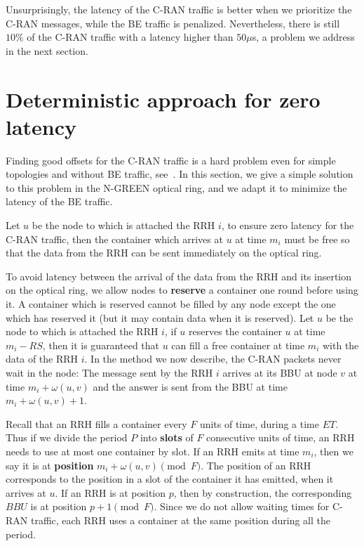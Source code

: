 \documentclass[]{llncs}
\begin{document}
Unsurprisingly, the latency of the C-RAN traffic is better when we prioritize the C-RAN messages, while the BE traffic is penalized. Nevertheless, there is still $10\%$ of the C-RAN traffic with a latency higher than $50 \mu$s, a problem we address in the next section.


\section{Deterministic approach for zero latency} \label{sec:deterministicalgorithms}

Finding good offsets for the C-RAN traffic is a hard problem even for simple topologies and without BE traffic, see~\cite{dominique2018deterministic}. In this section, we give a simple solution to this problem in the N-GREEN optical ring, and we adapt it to minimize the latency of the BE traffic.

Let $u$ be the node to which is attached the RRH $i$, to ensure zero latency for the C-RAN traffic, then the container which arrives at $u$ at time $m_i$ must be free so that the data from the RRH can be sent immediately on the optical ring. 

To avoid latency between the arrival of the data from the RRH and its insertion on the optical ring, 
we allow nodes to \textbf{reserve} a container one round before using it. A container which is reserved cannot be filled by any node except the one which has reserved it (but it may contain data when it is reserved). 
Let $u$ be the node to which is attached the RRH $i$, if $u$ reserves the container $u$ at time $m_i - RS$, then it is guaranteed that $u$ can fill a free container at time $m_i$ with the data of the RRH $i$.
In the method we now describe, the C-RAN packets never wait in the node: The message sent by the RRH $i$ arrives at its BBU at node $v$ at time $m_i + \omega(u,v)$ and the answer is sent from the BBU at time $m_i + \omega(u,v) +1$.

Recall that an RRH fills a container every $F$ units of time, during a time $ET$. 
Thus if we divide the period $P$ into \textbf{slots} of $F$ consecutive units of time, an RRH needs to use at most one container by slot. If an RRH emits at time $m_i$, then we say it is at \textbf{position} $m_i + \omega(u,v)\pmod F$. 
The position of an RRH corresponds to the position in a slot of the container it has emitted, when it arrives at $u$. 
If an RRH is at position $p$, then by construction, the corresponding $BBU$ is at position $p+1\pmod F$. Since we do not allow waiting times for C-RAN traffic, each RRH uses a container at the same position during all the period. 
\end{document}
